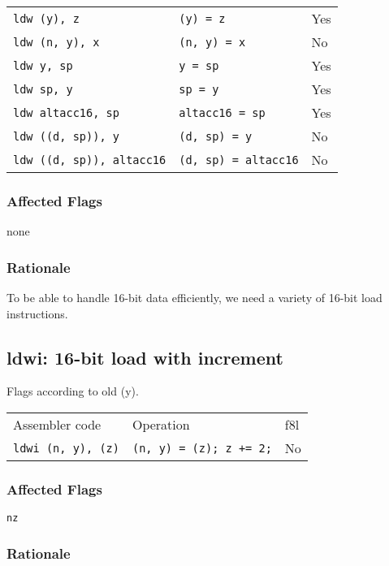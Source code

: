 \documentclass{book}
\begin{document}
\begin{tabular}{l l l}
\texttt{ldw (y), z}              & \texttt{(y) = z}            & Yes \\
\texttt{ldw (n, y), x}           & \texttt{(n, y) = x}         & No \\
\texttt{ldw y, sp}               & \texttt{y = sp}             & Yes \\
\texttt{ldw sp, y}               & \texttt{sp = y}             & Yes \\
\texttt{ldw altacc16, sp}        & \texttt{altacc16 = sp}      & Yes \\
\texttt{ldw ((d, sp)), y}        & \texttt{(d, sp) = y}        & No \\
\texttt{ldw ((d, sp)), altacc16} & \texttt{(d, sp) = altacc16} & No \\
\end{tabular}

\subsubsection*{Affected Flags}

none

\subsubsection*{Rationale}

To be able to handle 16-bit data efficiently, we need a variety of 16-bit load instructions.


\subsection{ldwi: 16-bit load with increment}

Flags according to old (y).

\begin{tabular}{l l l}
Assembler code         & Operation                         & f8l \\
\texttt{ldwi (n, y), (z)} & \texttt{(n, y) = (z); z += 2;} & No \\
\end{tabular}

\subsubsection*{Affected Flags}

\texttt{nz}

\subsubsection*{Rationale}
\end{document}
